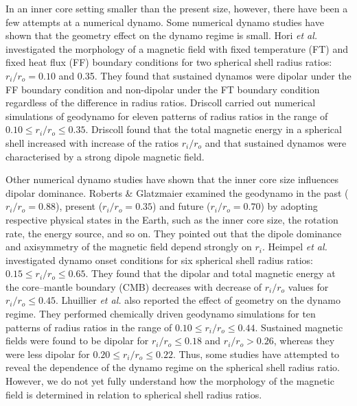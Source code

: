 {\color{red} %
In an inner core setting smaller than the present size, however, there have been a few attempts at a numerical dynamo. 
}
Some numerical dynamo studies have shown that the geometry effect on the dynamo regime is small. 
Hori {\it et al.}  investigated the morphology of a magnetic field with fixed temperature (FT) and fixed heat flux (FF) boundary conditions for two spherical shell radius ratios: $r_{i} / r_{o} = 0.10$ and 0.35. 
They found that sustained dynamos were dipolar under the FF boundary condition and non-dipolar under the FT boundary condition regardless of the difference in radius ratios. 
Driscoll  carried out numerical simulations of geodynamo for eleven patterns of radius ratios in the range of %
{\color{red} $0.10 \le r_{i} / r_{o} \le 0.35$}.
Driscoll  found that the total magnetic energy in a spherical shell increased with increase of the ratios $r_{i} / r_{o}$ and that sustained dynamos were characterised by a strong dipole magnetic field.

Other numerical dynamo studies have shown that the inner core size influences dipolar dominance. 
{\color{red}
Roberts \& Glatzmaier  examined the geodynamo in the past ($r_i / r_o = 0.88$), present ($r_i / r_o = 0.35$) and future ($r_i / r_o = 0.70$) by adopting respective physical states in the Earth, such as the inner core size, the rotation rate, the energy source, and so on.
They pointed out that the dipole dominance and axisymmetry of the magnetic field depend strongly on $r_i$.
}
Heimpel {\it et al.}  investigated dynamo onset conditions for six spherical shell radius ratios: %
{\color{red}$0.15 \le r_{i} / r_{o} \le 0.65$.}
They found that the dipolar and total magnetic energy at the core–mantle boundary (CMB) decreases with decrease of $r_{i} / r_{o}$ values for %
{\color{red}$r_{i} / r_{o} \le 0.45$.}
Lhuillier {\it et al.}  also reported the effect of geometry on the dynamo regime. 
They performed chemically driven geodynamo simulations for ten patterns of radius ratios in the range of %
{\color{red}$0.10 \le r_{i} / r_{o} \le 0.44$.}
Sustained magnetic fields were {\color{red}found to be} dipolar for  $r_{i} / r_{o} \le 0.18$ and  $r_{i} / r_{o} > 0.26$, whereas they were less dipolar for $0.20 \le r_{i} / r_{o} \le 0.22$. 
Thus, some studies have attempted to reveal the dependence of the dynamo regime on the spherical shell radius ratio.
{\color{red}However,} we do not yet fully understand how the morphology of the magnetic field is determined in relation to spherical shell radius ratios.

